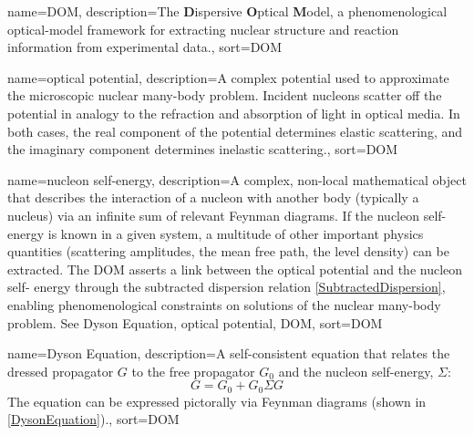 
\makeglossaries

{
    name={DOM},
    description={The \textbf{D}ispersive \textbf{O}ptical \textbf{M}odel, a phenomenological optical-model framework for extracting nuclear structure and reaction information from experimental data.},
    sort={DOM}
}

{
    name={optical potential},
    description={A complex potential used to approximate the microscopic nuclear many-body problem. Incident nucleons scatter off the potential in analogy to the refraction and absorption of light in optical media.  In both cases, the real component of the potential determines elastic scattering, and the imaginary component determines inelastic scattering.},
    sort={DOM}
}

{
    name={nucleon self-energy},
    description={A complex, non-local mathematical object that describes the interaction of a
        nucleon with another body (typically a nucleus) via an infinite sum of relevant Feynman 
        diagrams. If the nucleon self-energy is known in a given system, a multitude of other 
        important physics quantities (scattering amplitudes, the mean free path, the level density) 
        can be extracted. The DOM asserts a link between the optical potential and the nucleon self-
        energy through the subtracted dispersion relation \ref{SubtractedDispersion}, enabling 
        phenomenological constraints on solutions of the nuclear many-body 
        problem. See \Gls{Dyson Equation}, \Gls{optical potential}, \Gls{DOM}},
    sort={DOM}
}

{
    name={Dyson Equation},
    description={A self-consistent equation that relates the dressed propagator $G$ to the free
        propagator $G_{0}$ and the \Gls{nucleon self-energy}, $\Sigma$:
        \begin{equation}
            G = G_{0} + G_{0} \Sigma G
        \end{equation}
        The equation can be expressed pictorally via Feynman diagrams (shown in
        \ref{DysonEquation}).},
    sort={DOM}
}
